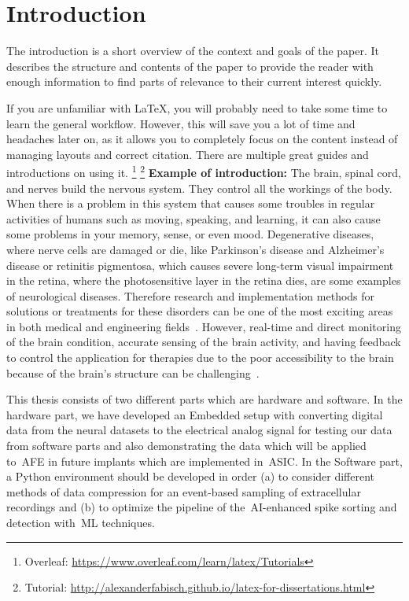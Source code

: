 \chapter{Introduction}
The introduction is a short overview of the context and goals of the paper.
It describes the structure and contents of the paper
to provide the reader with enough information
to find parts of relevance to their current interest quickly.

If you are unfamiliar with {\LaTeX},
you will probably need to take some time to learn the general workflow.
However, this will save you a lot of time and headaches later on,
as it allows you to completely focus on the content
instead of managing layouts and correct citation.
There are multiple great guides and introductions on using it.
\footnote{Overleaf: \url{https://www.overleaf.com/learn/latex/Tutorials}}
\footnote{Tutorial: \url{http://alexanderfabisch.github.io/latex-for-dissertations.html}}
\newpage
\textbf{Example of introduction:}\newline
The brain, spinal cord, and nerves build the nervous system. They control all the workings of the body. When there is a problem in this system that causes some troubles in regular activities of humans such as moving, speaking, and learning, it can also cause some problems in your memory, sense, or even mood.
Degenerative diseases, where nerve cells are damaged or die, like Parkinson's disease and Alzheimer's disease or retinitis pigmentosa, which causes severe long-term visual impairment in the retina, where the photosensitive layer in the retina dies, are some examples of neurological diseases.
Therefore research and implementation methods for solutions or treatments for these disorders can be one of the most exciting areas in both medical and engineering fields~\cite{Lee2021}. However, real-time and direct monitoring of the brain condition, accurate sensing of the brain activity, and having feedback to control the application for therapies due to the poor accessibility to the brain because of the brain's structure can be challenging~\cite{Lee2021}.

This thesis consists of two different parts which are hardware and software. In the hardware part, we have developed an Embedded setup with converting digital data from the neural datasets to the electrical analog signal for testing our data from software parts and also demonstrating the data which will be applied to~\ac{AFE} in future implants which are implemented in~\ac{ASIC}. 
In the Software part, a Python environment should be developed in order (a) to consider different methods of data compression for an event-based sampling of extracellular recordings and (b) to optimize the pipeline of the~\ac{AI}-enhanced spike sorting and detection with~\ac{ML} techniques. 
